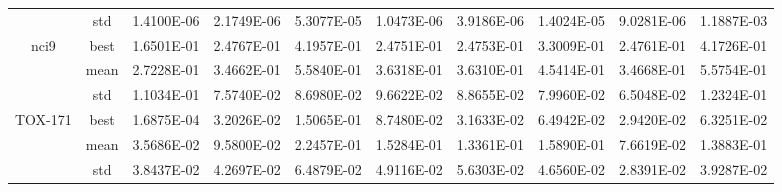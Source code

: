 \documentclass{wzuthesis}
\begin{document}
\begin{table}[htbp]
\begin{tabular}{cccccccccc}
          & std   & 1.4100E-06 & 2.1749E-06 & 5.3077E-05 & 1.0473E-06 & 3.9186E-06 & 1.4024E-05 & 9.0281E-06 & 1.1887E-03 \\
    \multirow{3}[0]{*}{nci9} & best  & 1.6501E-01 & 2.4767E-01 & 4.1957E-01 & 2.4751E-01 & 2.4753E-01 & 3.3009E-01 & 2.4761E-01 & 4.1726E-01 \\
          & mean  & 2.7228E-01 & 3.4662E-01 & 5.5840E-01 & 3.6318E-01 & 3.6310E-01 & 4.5414E-01 & 3.4668E-01 & 5.5754E-01 \\
          & std   & 1.1034E-01 & 7.5740E-02 & 8.6980E-02 & 9.6622E-02 & 8.8655E-02 & 7.9960E-02 & 6.5048E-02 & 1.2324E-01 \\
    \multirow{3}[0]{*}{TOX-171} & best  & 1.6875E-04 & 3.2026E-02 & 1.5065E-01 & 8.7480E-02 & 3.1633E-02 & 6.4942E-02 & 2.9420E-02 & 6.3251E-02 \\
          & mean  & 3.5686E-02 & 9.5800E-02 & 2.2457E-01 & 1.5284E-01 & 1.3361E-01 & 1.5890E-01 & 7.6619E-02 & 1.3883E-01 \\
          & std   & 3.8437E-02 & 4.2697E-02 & 6.4879E-02 & 4.9116E-02 & 5.6303E-02 & 4.6560E-02 & 2.8391E-02 & 3.9287E-02 \\
    \bottomrule      
    \end{tabular}%
  \label{tb:FS-fitness}%
\end{table}%
\end{document}
